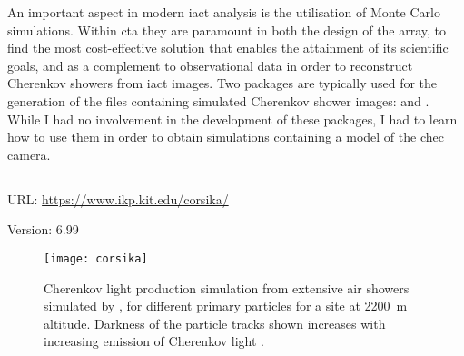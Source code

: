 An important aspect in modern \gls{iact} analysis is the utilisation of Monte Carlo simulations. Within \gls{cta} they are paramount in both the design of the array, to find the most cost-effective solution that enables the attainment of its scientific goals, and as a complement to observational data in order to reconstruct Cherenkov showers from \gls{iact} images. Two packages are typically used for the generation of the files containing simulated Cherenkov shower images:  and . While I had no involvement in the development of these packages, I had to learn how to use them in order to obtain simulations containing a model of the \gls{chec} camera.

\subsection{}
\vspace{-0.7em}
\noindent \hspace{\parindent} {\tiny URL: \url{https://www.ikp.kit.edu/corsika/} \par}
\noindent \hspace{\parindent} {\tiny Version: 6.99 \par}

\begin{figure}
  \texttt{[image: corsika]}
  \caption[ extensive air shower simulations.]{Cherenkov light production simulation from extensive air showers simulated by , for different primary particles for a site at \SI{2200}{m} altitude. Darkness of the particle tracks shown increases with increasing emission of Cherenkov light \cite{Bernlohr2008}.}
  \label{fig:corsika}
\end{figure}

